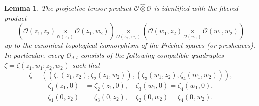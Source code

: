 \documentclass[12pt,reqno]{amsart}%
\theoremstyle{plain}
\newtheorem{lemma}{Lemma}
\numberwithin{theorem}{section} \numberwithin{equation}{section}
\numberwithin{lemma}{section}
\numberwithin{remark}{section}
\numberwithin{example}{section}
\numberwithin{proposition}{section}
\numberwithin{definition}{section}
\numberwithin{corollary}{section}
\begin{document}
\begin{lemma}
\label{lemTech2}The projective tensor product $\mathcal{O}\widehat{\otimes
}\mathcal{O}$ is identified with the fibered product
\[
\left(  \mathcal{O}\left(  z_{1},z_{2}\right)  \underset{\mathcal{O}\left(
z_{1}\right)  }{\times}\mathcal{O}\left(  z_{1},w_{2}\right)  \right)
\underset{\mathcal{O}\left(  z_{2},w_{2}\right)  }{\times}\left(
\mathcal{O}\left(  w_{1},z_{2}\right)  \underset{\mathcal{O}\left(
w_{1}\right)  }{\times}\mathcal{O}\left(  w_{1},w_{2}\right)  \right)
\]
up to the canonical topological isomorphism of the Fr\'{e}chet spaces (or
presheaves). In particular, every $\mathcal{O}_{d,l}$ consists of the
following compatible quadruples $\zeta=\zeta\left(  z_{1},w_{1};z_{2}%
,w_{2}\right)  $ such that
\[
\zeta=\left(  \left(  \zeta_{1}\left(  z_{1},z_{2}\right)  ,\zeta_{2}\left(
z_{1},w_{2}\right)  \right)  ,\left(  \zeta_{3}\left(  w_{1},z_{2}\right)
,\zeta_{4}\left(  w_{1},w_{2}\right)  \right)  \right)  ,
\]%
\begin{align*}
\zeta_{1}\left(  z_{1},0\right)   &  =\zeta_{2}\left(  z_{1},0\right)
,\quad\zeta_{3}\left(  w_{1},0\right)  =\zeta_{4}\left(  w_{1},0\right)  ,\\
\zeta_{1}\left(  0,z_{2}\right)   &  =\zeta_{3}\left(  0,z_{2}\right)
,\quad\zeta_{2}\left(  0,w_{2}\right)  =\zeta_{4}\left(  0,w_{2}\right)  .
\end{align*}

\end{lemma}
\end{document}
